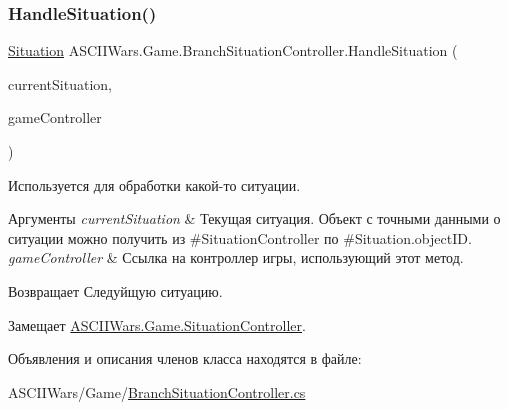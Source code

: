 \subsubsection{\texorpdfstring{Handle\+Situation()}{HandleSituation()}}
{\footnotesize\ttfamily \hyperlink{class_a_s_c_i_i_wars_1_1_game_1_1_situation}{Situation} A\+S\+C\+I\+I\+Wars.\+Game.\+Branch\+Situation\+Controller.\+Handle\+Situation (\begin{DoxyParamCaption}\item[{\hyperlink{class_a_s_c_i_i_wars_1_1_game_1_1_situation}{Situation}}]{current\+Situation,  }\item[{\hyperlink{class_a_s_c_i_i_wars_1_1_game_1_1_game_controller}{Game\+Controller}}]{game\+Controller }\end{DoxyParamCaption})\hspace{0.3cm}{\ttfamily [inline]}}



Используется для обработки какой-\/то ситуации. 


\begin{DoxyParams}{Аргументы}
{\em current\+Situation} & Текущая ситуация. Объект с точными данными о ситуации можно получить из \#\+Situation\+Controller по \#\+Situation.\+object\+ID. \\
\hline
{\em game\+Controller} & Ссылка на контроллер игры, использующий этот метод. \\
\hline
\end{DoxyParams}
\begin{DoxyReturn}{Возвращает}
Следуйщую ситуацию. 
\end{DoxyReturn}


Замещает \hyperlink{interface_a_s_c_i_i_wars_1_1_game_1_1_situation_controller_a2cf0359dfc1683beb63f0dfed1c372e6}{A\+S\+C\+I\+I\+Wars.\+Game.\+Situation\+Controller}.



Объявления и описания членов класса находятся в файле\+:\begin{DoxyCompactItemize}
\item 
A\+S\+C\+I\+I\+Wars/\+Game/\hyperlink{_branch_situation_controller_8cs}{Branch\+Situation\+Controller.\+cs}\end{DoxyCompactItemize}
